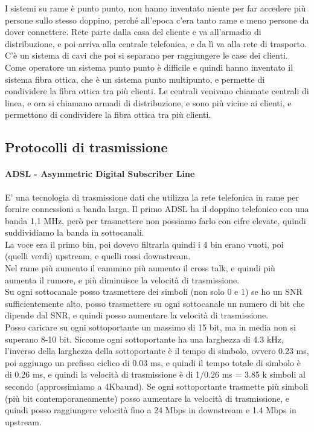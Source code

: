 I sistemi su rame è punto punto, non hanno inventato niente per far accedere più persone sullo stesso doppino, perché all'epoca c'era tanto rame e meno persone da dover connettere. 
Rete parte dalla casa del cliente e va all'armadio di distribuzione, e poi arriva alla centrale telefonica, e da lì va alla rete di trasporto.\\

C'è un sistema di cavi che poi si separano per raggiungere le case dei clienti.\\
Come operatore un sistema punto punto è difficile e quindi hanno inventato il sistema fibra ottica, che è un sistema punto multipunto, e permette di condividere la fibra ottica tra più clienti.
Le centrali venivano chiamate centrali di linea, e ora si chiamano armadi di distribuzione, e sono più vicine ai clienti, e permettono di condividere la fibra ottica tra più clienti.\\

\subsection{Protocolli di trasmissione}
\paragraph{ADSL - Asymmetric Digital Subscriber Line}
E' una tecnologia di trasmissione dati che utilizza la rete telefonica in rame per fornire connessioni a banda larga.
Il primo ADSL ha il doppino telefonico con una banda 1,1 MHz, però per trasmettere non possiamo farlo con cifre elevate, quindi suddividiamo la banda in sottocanali. \\

La voce era il primo bin, poi dovevo filtrarla quindi i 4 bin erano vuoti, poi (quelli verdi) upstream, e quelli rossi downstream.\\

Nel rame più aumento il cammino più aumento il cross talk, e quindi più aumenta il rumore, e più diminuisce la velocità di trasmissione.\\

Su ogni sottocanale posso trasmettere dei simboli (non solo 0 e 1) se ho un SNR sufficientemente alto, posso trasmettere su ogni sottocanale un numero di bit che dipende dal SNR, e quindi 
posso aumentare la velocità di trasmissione.\\

Posso caricare su ogni sottoportante un massimo di 15 bit, ma in media non si superano 8-10 bit. Siccome ogni sottoportante ha una larghezza di 4.3 kHz, l'inverso della larghezza della sottoportante 
è il tempo di simbolo, ovvero 0.23 ms, poi aggiungo un prefisso ciclico di 0.03 ms, e quindi il tempo totale di simbolo è di 0.26 ms, 
e quindi la velocità di trasmissione è di 1/0.26 ms = 3.85 k simboli al secondo (approssimiamo a 4Kbaund). Se ogni sottoportante trasmette più simboli (più bit contemporaneamente)
posso aumentare la velocità di trasmissione, e quindi posso raggiungere velocità fino a 24 Mbps in downstream e 1.4 Mbps in upstream.\\

